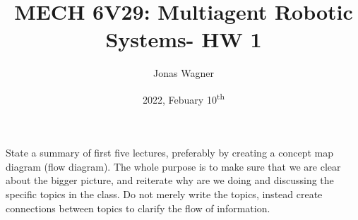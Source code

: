 \documentclass[]{article}
\title{MECH 6V29: Multiagent Robotic Systems- HW 1}
\author{Jonas Wagner}
\date{2022, Febuary 10\textsuperscript{th}}
\numberwithin{equation}{section}
\begin{document}
	

\maketitle



\section{}
State a summary of first five lectures, preferably by creating a concept map diagram (flow diagram). 
The whole purpose is to make sure that we are clear about the bigger picture, 
and reiterate why are we doing and discussing the specific topics in the class. 
Do not merely write the topics, instead create connections between topics to clarify the flow of information.
\end{document}
